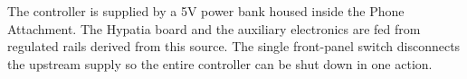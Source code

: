 The controller is supplied by a 5V power bank housed inside the Phone Attachment. The Hypatia board and the auxiliary electronics are fed from regulated rails derived from this source. The single front-panel switch disconnects the upstream supply so the entire controller can be shut down in one action.

\newpage
